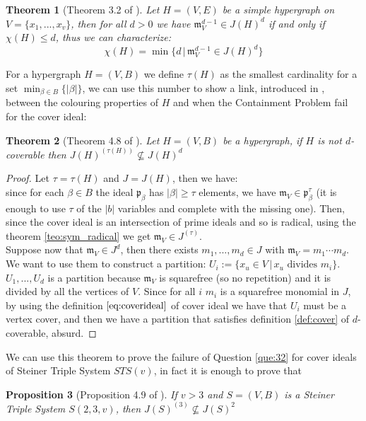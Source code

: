 \documentclass[notitlepage, a4]{book}
\theoremstyle{plain}
\newtheorem{teo}{Theorem}[section]
\newtheorem{prop}[teo]{Proposition}
\theoremstyle{remark}
\theoremstyle{definition}
\newcommand{\p}{\mathfrak{p}}
\newcommand{\mm}{\mathfrak{m}}
\newcounter{que}
\begin{document}
\begin{teo}[Theorem 3.2 of \cite{Fran10Colourings}] \label{teo:col:chi}
Let $ H = (V,E) $ be a simple hypergraph on $ V = \{ x_1 , ... , x_v\} $, then for all $ d >0 $ we have $ \mm_V^{d-1} \in J(H)^d $ if and only if $ \chi(H) \leq d $, thus we can characterize:
\begin{equation}\label{eq:col:chi}
 \chi(H)   = \min \{ d \,|\, \mm_V^{d-1} \in J(H)^d\}
 \end{equation}
\end{teo}



For a hypergraph $ H = (V,B) $ we define $ \tau (H) $ as the smallest cardinality for a set $ \min_{\beta \in B} \{ |\beta |\}$, we can use this number to show a link, introduced in \cite{Bal21Steiner}, between the colouring properties of $ H $ and when the Containment Problem fail for the cover ideal:

\begin{teo}[Theorem 4.8 of \cite{Bal21Steiner}] \label{teo:col:cont}
Let $ H = (V,B) $ be a hypergraph, if $ H $ is not $ d $-coverable then $ J(H)^{(\tau(H))} \not \subseteq J(H)^d $
\end{teo}

\begin{proof}
Let $\tau = \tau (H)$ and $ J = J(H) $, then we have:\\
since for each $ \beta \in B $ the ideal $ \p_\beta $ has $ |\beta | \geq \tau $ elements, we have $ \mm_V \in \p_\beta^\tau $ (it is enough to use $\tau$ of the $ |b| $ variables and complete with the missing one). Then, since the cover ideal is an intersection of prime ideals and so is radical, using the theorem \ref{teo:sym_radical} we get $ \mm_V \in J^{(\tau)} $.\\
Suppose now that $ \mm_V \in J^d $, then there exists $ m_1 , ... , m_d \in J $ with $ \mm_V = m_1 \cdots m_d $. We want to use them to construct a partition: $ U_i := \{ x_u \in V \,|\, x_u \text{ divides } m_i\} $. $ U_1 , ... ,U_d $ is a partition because $ \mm_V $ is squarefree (so no repetition) and it is divided by all the vertices of $ V $. Since for all $ i $  $ m_i $ is a squarefree monomial in $ J $, by using the definition $ \ref{eq:coverideal} $ of cover ideal we have that $ U_i $ must be a vertex cover, and then we have a partition that satisfies definition \ref{def:cover} of $ d $-coverable, absurd. 
\end{proof}

We can use this theorem to prove the failure of Question \ref{que:32} for cover ideals of Steiner Triple System $ STS(v) $, in fact it is enough to prove that 
\begin{prop}[Proposition 4.9 of \cite{Bal21Steiner}]
If $ v>3 $ and $ S = (V,B) $ is a Steiner Triple System $ S(2,3,v) $, then $ J(S)^{(3)}  \not \subseteq J(S)^2$
\end{prop}
\end{document}
